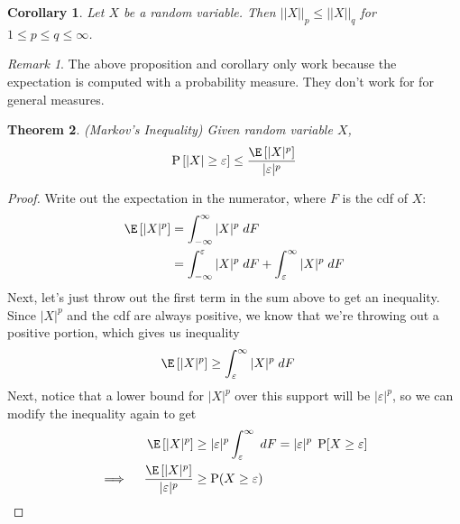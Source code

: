 \documentclass[12pt]{article}
\theoremstyle{plain}
\newtheorem{thm}{Theorem}[section]
\newtheorem{cor}[thm]{Corollary}
\theoremstyle{definition}
\theoremstyle{remark}
\newtheorem*{rmk}{Remark}
\newcommand{\Prb}{\operatorname{P}}
\begin{document}
\begin{cor}
Let $X$ be a random variable. Then $||X||_p\leq ||X||_q$ for
$1\leq p\leq q\leq \infty$.
\end{cor}

\begin{rmk}
The above proposition and corollary only work because the expectation is
computed with a probability measure. They don't work for for general
measures.
\end{rmk}

\begin{thm}{\emph{(Markov's Inequality)}}
\label{thm:markov}
Given random variable $X$,
\begin{equation}
    \label{markov}
    \Prb\left[
      \left\lvert X\right\rvert
      \geq \varepsilon\right]
    \leq \frac{\E\left[|X|^p\right]}{|\varepsilon|^p}
\end{equation}
\end{thm}

\begin{proof}
Write out the expectation in the numerator, where $F$ is the cdf of $X$:
\begin{align*}
  \E\left[|X|^p\right]
  &= \int^\infty_{-\infty} |X|^p \; dF \\
  &= \int^{\varepsilon}_{-\infty} |X|^p \; dF
    + \int^\infty_{\varepsilon} |X|^p \; dF
\end{align*}
Next, let's just throw out the first term in the sum above to get an
inequality. Since $|X|^p$ and the cdf are always positive, we know that
we're throwing out a positive portion, which gives us inequality
\begin{align*}
  \E\left[|X|^p\right]
  &\geq \int^\infty_{\varepsilon} |X|^p \; dF
\end{align*}
Next, notice that a lower bound for $|X|^p$ over this support will be
$|\varepsilon|^p$, so we can modify the inequality again to get
\begin{align*}
  \E\left[|X|^p\right]
  &\geq  |\varepsilon|^p \int^\infty_{\varepsilon} \; dF
  = |\varepsilon|^p \; \Prb[X\geq \varepsilon] \\
  \implies \quad
  \frac{\E\left[|X|^p\right]}{|\varepsilon|^p}
  &\geq \Prb(X\geq \varepsilon)
\end{align*}
\end{proof}
\end{document}
